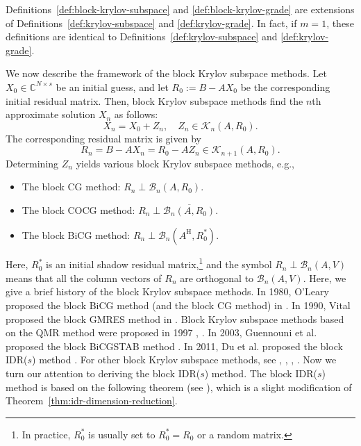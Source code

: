 \par{}
\begin{Remark}\label{rem:block-grade-scalar-reduction}
{Definitions\ \ref{def:block-krylov-subspace} and \ref{def:block-krylov-grade} are extensions of Definitions\ \ref{def:krylov-subspace} and \ref{def:krylov-grade}. In fact, if $m=1$, these definitions are identical to Definitions\ \ref{def:krylov-subspace} and \ref{def:krylov-grade}.}
\end{Remark}
{We now describe the framework of the block Krylov subspace methods. Let $X_0\in\mathbb C^{N\times s}$ be an initial guess, and let $R_0:=B-AX_0$ be the corresponding initial residual matrix. Then, block Krylov subspace methods find the $n$th approximate solution $X_n$ as follows:}
\[X_n=X_0+Z_n,\quad Z_n\in\mathcal K_n(A,R_0).\]
{The corresponding residual matrix is given by}
\[R_n=B-AX_n=R_0-AZ_n\in\mathcal K_{n+1}(A,R_0).\]
{Determining $Z_n$ yields various block Krylov subspace methods, e.g.,}
\begin{itemize}
\item{The block CG method:} $R_n\perp\mathcal B_n(A,R_0)$.
\item{The block COCG method:} $R_n\perp\overline{\mathcal B_n(A,R_0)}$.
\item{The block BiCG method:} $R_n\perp\mathcal B_n(A^{\mathrm H},R_0^{*})$.
\end{itemize}
{Here, $R_0^{*}$ is an initial shadow residual matrix,}\footnote{{In practice, $R_0^{*}$ is usually set to $R_0^{*}=R_0$ or a random matrix.}}
{and the symbol $R_n\perp\mathcal B_n(A,V)$ means that all the column vectors of $R_n$ are orthogonal to $\mathcal B_n(A,V)$.}
{Here, we give a brief history of the block Krylov subspace methods. In 1980, O’Leary proposed the block BiCG method (and the block CG method) in . In 1990, Vital proposed the block GMRES method in . Block Krylov subspace methods based on the QMR method were proposed in 1997 , . In 2003, Guennouni et al. proposed the block BiCGSTAB method . In 2011, Du et al. proposed the block IDR($s$) method . For other block Krylov subspace methods, see , , , .}
{Now we turn our attention to deriving the block IDR($s$) method. The block IDR($s$) method is based on the following theorem (see ), which is a slight modification of Theorem\ \ref{thm:idr-dimension-reduction}.}
